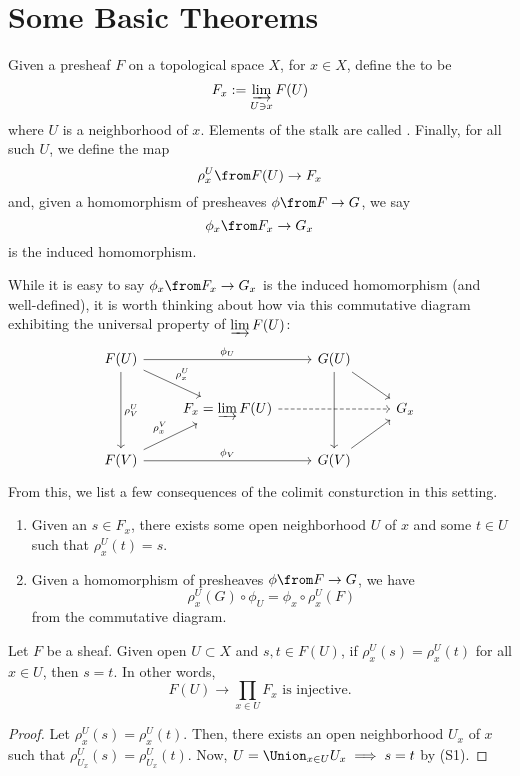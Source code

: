 \documentclass[11pt,leqno,oneside]{amsbook}
\renewcommand{\F}{F} %
\newcommand{\G}{G}
\numberwithin{thm}{section}
\begin{document}
\section{Some Basic Theorems}
\begin{defn}
  Given a presheaf \(\F\) on a topological space \(X\), for \(x \in
  X\), define the  to be \[
    \F_x := \varinjlim_{U \ni x} \F(U)
  \]
  where \(U\) is a neighborhood of \(x\). Elements of the stalk are
  called . Finally, for all such \(U\), we define the map \[
    \rho_x^U \from \F(U) \to \F_x
  \]
  and, given a homomorphism of presheaves \(\phi \from \F \to \G\), we
  say \[
    \phi_x \from \F_x \to \G_x
  \]
  is the induced homomorphism.
\end{defn}
While it is easy to say \(\phi_x \from \F_x \to \G_x\) is the induced
homomorphism (and well-defined), it is worth thinking about how via
this commutative diagram exhibiting the universal property of \(\varinjlim
\F(U)\): \[
    \begin{tikzcd}
      \F(U) \ar[dd, "\rho^U_V"] \ar[rd, "\rho^U_x"] \ar[rr, "\phi_U"] & & \G(U)
      \ar[rd] \ar[dd]\\
      & \F_x = \varinjlim \F(U) \ar[rr, dashed]& & \G_x\\
      \F(V) \ar[ru, "\rho^V_x"] \ar[rr, "\phi_V"] & & \G(V) \ar[ru]
    \end{tikzcd}
  \]
From this, we list a few consequences of the colimit consturction in
this setting.
\begin{prop}
  \begin{enumerate}
  \item Given an \(s \in \F_x\), there exists some open neighborhood
    \(U\) of \(x\) and some \(t \in U\) such that \(\rho^U_x(t) = s\).
  \item Given a homomorphism of presheaves \(\phi \from \F \to \G\),
    we have \[
      \rho^U_x(\G) \circ \phi_U = \phi_x \circ \rho^U_x(\F)
    \]
    from the commutative diagram.
  \end{enumerate}
\end{prop}
\begin{lem}
  Let \(\F\) be a sheaf. Given open \(U \subset X\) and \(s,t \in
  \F(U)\), if \(\rho_x^U(s) = \rho_x^U(t)\) for all \(x \in U\), then
  \(s=t\). In other words, \[
    \F(U) \to \prod_{x \in U} F_x \text{ is injective.}
  \]
\end{lem}
\begin{proof}
  Let \(\rho_x^U(s) = \rho_x^U(t)\). Then, there exists an open neighborhood
  \(U_x\) of \(x\) such that \(\rho_{U_x}^U(s) =
  \rho_{U_x}^U(t)\). Now, \(U = \Union_{x \in U} U_x \implies s=t\) by
  (S1). 
\end{proof}
\end{document}
